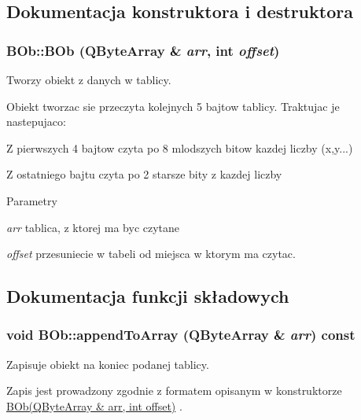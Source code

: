 \subsection{Dokumentacja konstruktora i destruktora}
\hypertarget{class_b_ob_ab71739ff83cf58d15b42f26274c583d1}{
\subsubsection[{BOb}]{\setlength{\rightskip}{0pt plus 5cm}BOb::BOb (QByteArray \& {\em arr}, \/  int {\em offset})}}
\label{class_b_ob_ab71739ff83cf58d15b42f26274c583d1}


Tworzy obiekt z danych w tablicy. 

Obiekt tworzac sie przeczyta kolejnych 5 bajtow tablicy. Traktujac je nastepujaco:

\begin{DoxyItemize}
\item Z pierwszych 4 bajtow czyta po 8 mlodszych bitow kazdej liczby (x,y...) \item Z ostatniego bajtu czyta po 2 starsze bity z kazdej liczby\end{DoxyItemize}

\begin{DoxyParams}{Parametry}
\item[{\em arr}]tablica, z ktorej ma byc czytane \item[{\em offset}]przesuniecie w tabeli od miejsca w ktorym ma czytac. \end{DoxyParams}


\subsection{Dokumentacja funkcji składowych}
\hypertarget{class_b_ob_a11fbd7ab4c8dda600232b40b02a20cbe}{
\subsubsection[{appendToArray}]{\setlength{\rightskip}{0pt plus 5cm}void BOb::appendToArray (QByteArray \& {\em arr}) const}}
\label{class_b_ob_a11fbd7ab4c8dda600232b40b02a20cbe}


Zapisuje obiekt na koniec podanej tablicy. 

Zapis jest prowadzony zgodnie z formatem opisanym w konstruktorze \hyperlink{class_b_ob_ab71739ff83cf58d15b42f26274c583d1}{BOb(QByteArray \& arr, int offset)} .



